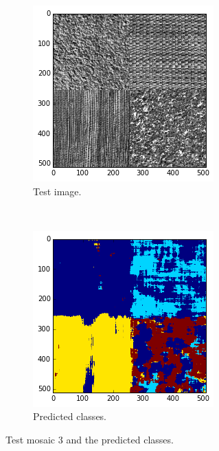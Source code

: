 \documentclass[a4paper]{article}
\begin{document}
\begin{figure}
    \centering
    \begin{subfigure}[b]{0.23\textwidth}
        \centering
        \includegraphics[width=\textwidth]{mosaic3_test.png}
        \caption{%
            Test image.
        }
    \end{subfigure}
    ~
    \begin{subfigure}[b]{0.23\textwidth}
        \centering
        \includegraphics[width=\textwidth]{mosaic3_pred.png}
        \caption{%
            Predicted classes.
        }
    \end{subfigure}
    \caption{%
        Test mosaic 3 and the predicted classes.
    }
    \label{fig:test3}
\end{figure}
\end{document}
